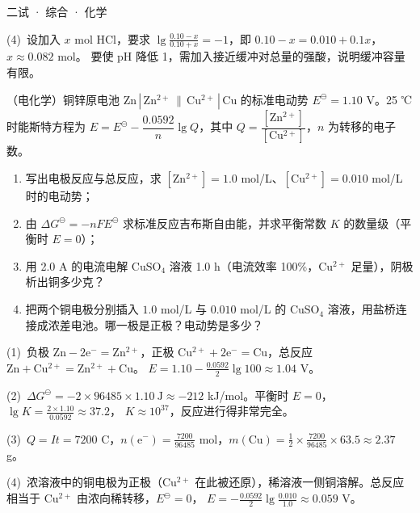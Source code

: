 \documentclass[cjk=noto, seal=first]{mojing-exam}
\begin{document}
\begin{paper}[time={建议 1.5 小时（训练设置）}, full=100]{二试 · 综合 · 化学}
\begin{questions}
\begin{solution}
(4)~设加入 $x$ mol HCl，要求 $\lg\frac{0.10-x}{0.10+x}=-1$，即 $0.10-x=0.010+0.1x$，$x\approx0.082$ mol。
要使 pH 降低 1，需加入接近缓冲对总量的强酸，说明缓冲容量有限。
\end{solution}

\question[25]
（电化学）铜锌原电池 $\mathrm{Zn\,|\,Zn^{2+}\,\|\,Cu^{2+}\,|\,Cu}$ 的标准电动势 $E^\ominus=1.10$ V。25 ℃ 时能斯特方程为
$E=E^\ominus-\dfrac{0.0592}{n}\lg Q$，其中 $Q=\dfrac{[\mathrm{Zn^{2+}}]}{[\mathrm{Cu^{2+}}]}$，$n$ 为转移的电子数。
\begin{enumerate}
  \item 写出电极反应与总反应，求 $[\mathrm{Zn^{2+}}]=1.0$ mol/L、$[\mathrm{Cu^{2+}}]=0.010$ mol/L 时的电动势；
  \item 由 $\Delta G^\ominus=-nFE^\ominus$ 求标准反应吉布斯自由能，并求平衡常数 $K$ 的数量级（平衡时 $E=0$）；
  \item 用 2.0 A 的电流电解 $\mathrm{CuSO_4}$ 溶液 1.0 h（电流效率 100\%，$\mathrm{Cu^{2+}}$ 足量），阴极析出铜多少克？
  \item 把两个铜电极分别插入 $1.0$ mol/L 与 $0.010$ mol/L 的 $\mathrm{CuSO_4}$ 溶液，用盐桥连接成浓差电池。哪一极是正极？电动势是多少？
\end{enumerate}
\answerspace{2cm}
\begin{solution}
(1)~负极 $\mathrm{Zn-2e^-=Zn^{2+}}$，正极 $\mathrm{Cu^{2+}+2e^-=Cu}$，总反应 $\mathrm{Zn+Cu^{2+}=Zn^{2+}+Cu}$。
$E=1.10-\frac{0.0592}2\lg100\approx1.04$ V。

(2)~$\Delta G^\ominus=-2\times96485\times1.10\ \mathrm J\approx-212$ kJ/mol。平衡时 $E=0$，$\lg K=\frac{2\times1.10}{0.0592}\approx37.2$，
$K\approx10^{37}$，反应进行得非常完全。

(3)~$Q=It=7200$ C，$n(\mathrm e^-)=\frac{7200}{96485}$ mol，$m(\mathrm{Cu})=\frac12\times\frac{7200}{96485}\times63.5\approx2.37$ g。

(4)~浓溶液中的铜电极为正极（$\mathrm{Cu^{2+}}$ 在此被还原），稀溶液一侧铜溶解。总反应相当于 $\mathrm{Cu^{2+}}$ 由浓向稀转移，$E^\ominus=0$，
$E=-\frac{0.0592}2\lg\frac{0.010}{1.0}\approx0.059$ V。
\end{solution}


\end{questions}
\end{paper}
\end{document}
